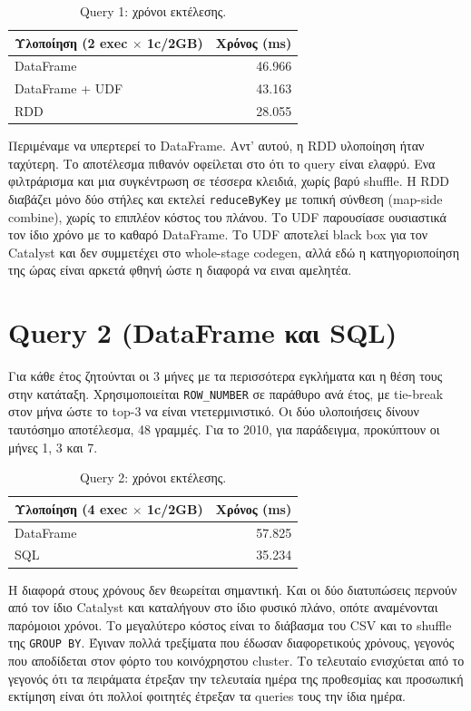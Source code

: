 \documentclass[11pt]{article}
\newcommand{\code}[1]{\texttt{\small #1}}
\newcommand{\en}[1]{\textenglish{#1}}
\begin{document}
\begin{table}[h]\centering
\begin{tabular}{lr}
\toprule
Υλοποίηση (2 \en{exec} $\times$ 1\en{c}/2\en{GB}) & Χρόνος (ms) \\
\midrule
\en{DataFrame}        & 46.966 \\
\en{DataFrame + UDF}  & 43.163 \\
\en{RDD}              & 28.055 \\
\bottomrule
\end{tabular}
\caption{Query 1: χρόνοι εκτέλεσης.}
\end{table}

Περιμέναμε να υπερτερεί το \en{DataFrame}. Αντ' αυτού, η \en{RDD} υλοποίηση ήταν 
ταχύτερη. Το αποτέλεσμα πιθανόν οφείλεται στο ότι το query είναι ελαφρύ.
Ενα φιλτράρισμα και μια συγκέντρωση σε τέσσερα κλειδιά, χωρίς βαρύ
\en{shuffle}. Η \en{RDD} διαβάζει μόνο δύο στήλες και εκτελεί \code{reduceByKey} με
τοπική σύνθεση (\en{map-side combine}), χωρίς το επιπλέον κόστος του πλάνου. Το
\en{UDF} παρουσίασε ουσιαστικά τον ίδιο χρόνο με το καθαρό \en{DataFrame}. Το \en{UDF} αποτελεί \en{black box} για τον \en{Catalyst} και δεν συμμετέχει στο
\en{whole-stage codegen}, αλλά εδώ η κατηγοριοποίηση της ώρας είναι αρκετά
φθηνή ώστε η διαφορά να ειναι αμελητέα.

\section{Query 2 (DataFrame και SQL)}

Για κάθε έτος ζητούνται οι 3 μήνες με τα περισσότερα εγκλήματα και η θέση τους στην
κατάταξη. Χρησιμοποιείται \code{ROW\_NUMBER} σε παράθυρο ανά έτος, με \en{tie-break}
στον μήνα ώστε το \en{top-3} να είναι ντετερμινιστικό. Οι δύο υλοποιήσεις δίνουν
ταυτόσημο αποτέλεσμα, 48 γραμμές. Για το 2010, για παράδειγμα, προκύπτουν οι μήνες
1, 3 και 7.

\begin{table}[h]\centering
\begin{tabular}{lr}
\toprule
Υλοποίηση (4 \en{exec} $\times$ 1\en{c}/2\en{GB}) & Χρόνος (ms) \\
\midrule
\en{DataFrame} & 57.825 \\
\en{SQL}       & 35.234 \\
\bottomrule
\end{tabular}
\caption{Query 2: χρόνοι εκτέλεσης.}
\end{table}

Η διαφορά στους χρόνους δεν θεωρείται σημαντική. Και οι δύο διατυπώσεις περνούν από
τον ίδιο \en{Catalyst} και καταλήγουν στο ίδιο φυσικό πλάνο, οπότε αναμένονται
παρόμοιοι χρόνοι. Το μεγαλύτερο κόστος είναι το διάβασμα του \en{CSV} και το
\en{shuffle} της \code{GROUP BY}. Έγιναν πολλά τρεξίματα που έδωσαν διαφορετικούς χρόνους, 
γεγονός που αποδίδεται στον φόρτο του κοινόχρηστου cluster. Το τελευταίο ενισχύεται από το
γεγονός ότι τα πειράματα έτρεξαν την τελευταία ημέρα της προθεσμίας
και προσωπική εκτίμηση είναι ότι πολλοί φοιτητές έτρεξαν τα queries τους την ίδια ημέρα.
\end{document}
